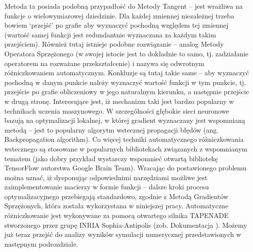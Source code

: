 \documentclass[12pt]{article}
\begin{document}
Metoda ta posiada podobną przypadłość do Metody Tangent – jest wrażliwa na funkcje o wielowymiarowej dziedzinie. Dla każdej zmiennej niezależnej trzeba bowiem ‘przejść’ po grafie aby wyznaczyć pochodną względem tej zmiennej (wartość samej funkcji jest redundantnie wyznaczana za każdym takim przejściem).  Również tutaj istnieje podobne rozwiązanie – analog Metody Operatora Sprzężonego (w swojej istocie jest to dokładnie to samo, tj. zadziałanie operatorem na rozważane przekształcenie) i nazywa się odwrotnym różniczkowaniem automatycznym.\newline
Konkluzje są tutaj takie same – aby wyznaczyć pochodną w danym punkcie należy wyznaczyć wartość funkcji w tym punkcie, tj. przejście po grafie obliczeniowy w jego naturalnym kierunku, a następnie przejście w drugą stronę. Interesujące jest, iż mechanizm taki jest bardzo popularny w technikach uczenia maszynowego. W szczególności głębokie sieci neuronowe bazują na optymalizacji lokalnej, w której gradient wyznaczany jest wspomnianą metodą – jest to popularny algorytm wstecznej propagacji błędów (ang. Backpropagation algorithm). Co więcej techniki automatycznego różniczkowania wstecznego są stosowane w popularnych bibliotekach związanych z wspomnianym tematem (jako dobry przykład wystarczy wspomnieć otwartą bibliotekę TensorFlow autorstwa Google Brain Team). \newline
Wracając do postawionego problemu można uznać, iż dysponując odpowiednimi narzędziami możliwe jest zaimplementowanie macierzy w formie funkcji – dalsze kroki procesu optymalizacyjnego przebiegają standardowo, zgodnie z Metodą Gradientów Sprzężonych, która została wykorzystana w niniejszej pracy. Automatyczne różniczkowanie jest wykonywane za pomocą otwartego silnika TAPENADE stworzonego przez grupę INRIA Sophia-Antipolis (zob. Dokumentacja \cite{Tapenade}). Możemy już teraz przejść do analizy wyników symulacji numerycznej przedstawionych w następnym podrozdziale.
\end{document}
